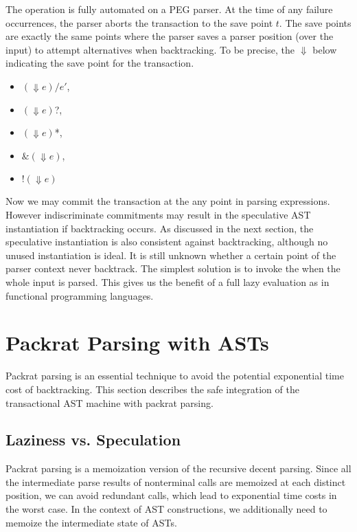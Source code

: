 \documentclass[JIP]{ipsj}
\begin{document}
The  operation is fully automated on a PEG parser.  At the time of any failure occurrences, the parser aborts the transaction to the save point $t$. The save points are exactly the same points where the parser saves a parser position (over the input) to attempt alternatives when backtracking. To be precise, the $\Downarrow$ below indicating the save point for the transaction.

\begin{itemize}
\item $(\Downarrow e) / e'$,
\item $(\Downarrow e)$?,
\item $(\Downarrow e)$*,
\item $\& ( \Downarrow e )$,
\item $! ( \Downarrow e )$
\end{itemize}

Now we may commit the transaction at the any point in parsing expressions. However indiscriminate commitments may result in the speculative AST instantiation if backtracking occurs. As discussed in the next section, the speculative instantiation is also consistent against backtracking, although no unused instantiation is ideal. It is still unknown whether a certain point of the parser context never backtrack. The simplest solution is to invoke the  when the whole input is parsed. This gives us the benefit of a full lazy evaluation as in functional programming languages.  

\section{Packrat Parsing with ASTs}

Packrat parsing\cite{ICFP02_PackratParsing} is an essential technique to avoid the potential exponential time cost of backtracking. This section describes the safe integration of  the transactional AST machine with packrat parsing.

\subsection{Laziness vs. Speculation}

Packrat parsing \cite{ICFP02_PackratParsing} is a memoization version of the recursive decent parsing. Since all the intermediate parse results of nonterminal calls are memoized at each distinct position, we can avoid redundant calls, which lead to exponential time costs in the worst case. In the context of AST constructions, we additionally need to memoize the intermediate state of ASTs.
\end{document}
